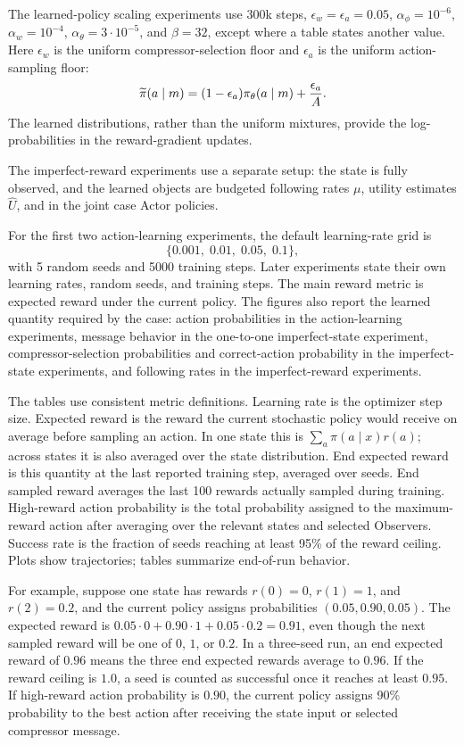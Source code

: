 \documentclass[11pt]{article}
\begin{document}
The learned-policy scaling experiments use 300k steps,
\(\epsilon_w=\epsilon_a=0.05\), \(\alpha_\phi=10^{-6}\),
\(\alpha_w=10^{-4}\), \(\alpha_\theta=3\cdot10^{-5}\), and
\(\beta=32\), except where a table states another value. Here
\(\epsilon_w\) is the uniform compressor-selection floor and
\(\epsilon_a\) is the uniform action-sampling floor:
\[
  \widetilde{\pi}(a\mid m)
  =(1-\epsilon_a)\pi_\theta(a\mid m)+{\epsilon_a\over A}.
\]
The learned distributions, rather than the uniform mixtures, provide the
log-probabilities in the reward-gradient updates.

The imperfect-reward experiments use a separate setup: the state is fully
observed, and the learned objects are budgeted following rates \(\mu\), utility
estimates \(\hat U\), and in the joint case Actor policies.

For the first two action-learning experiments, the default learning-rate grid is
\[
  \{0.001,\;0.01,\;0.05,\;0.1\},
\]
with 5 random seeds and 5000 training steps. Later experiments state their own
learning rates, random seeds, and training steps. The main reward metric is
expected reward under the current policy. The figures also report the learned
quantity required by the case:
action probabilities in the action-learning experiments, message behavior in the
one-to-one imperfect-state experiment,
compressor-selection probabilities and correct-action probability in the
imperfect-state experiments, and following rates in the imperfect-reward
experiments.

The tables use consistent metric definitions. Learning rate is the optimizer
step size. Expected reward is the reward the current stochastic policy would
receive on average before sampling an action. In one state this is
\(\sum_a\pi(a\mid x)r(a)\); across states it is also averaged over the state
distribution. End expected reward is this quantity at the last reported
training step, averaged over seeds. End sampled reward averages the last 100
rewards actually sampled during training. High-reward action probability is
the total probability assigned to the maximum-reward action after averaging
over the relevant states and selected Observers. Success rate is the fraction
of seeds reaching at least 95\% of the reward ceiling. Plots show trajectories;
tables summarize end-of-run behavior.

For example, suppose one state has rewards \(r(0)=0\), \(r(1)=1\), and
\(r(2)=0.2\), and the current policy assigns probabilities
\((0.05,0.90,0.05)\). The expected reward is
\(0.05\cdot0+0.90\cdot1+0.05\cdot0.2=0.91\), even though the next sampled
reward will be one of \(0\), \(1\), or \(0.2\). In a three-seed run, an
end expected reward of \(0.96\) means the three end expected rewards average to
\(0.96\). If the reward ceiling is \(1.0\), a seed is counted as successful
once it reaches at least \(0.95\). If high-reward action probability is
\(0.90\), the current policy assigns 90\% probability to the best action after
receiving the state input or selected compressor message.
\end{document}
